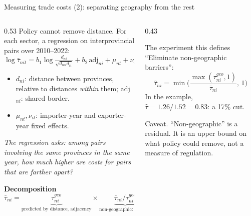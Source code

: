 \documentclass[aspectratio=169,9pt,t]{beamer}
\newcommand{\h}[1]{\hat{#1}}
\newcommand{\plain}[1]{{\color{ipgrey}\small\itshape #1}}
\begin{document}
\begin{frame}{Measuring trade costs (2): separating geography from the rest}
  \begin{columns}[T]
    \begin{column}{0.53\textwidth}
      Policy cannot remove distance. For each sector, a regression on
      interprovincial pairs over 2010--2022:
      {\small\[ \log\bar\tau_{nit}=b_1\log\tfrac{d_{ni}}{\sqrt{d_{nn}d_{ii}}}
         +b_2\,\text{adj}_{ni}+\mu_{nt}+\nu_{it}+\varepsilon_{nit} \]}
      \begin{itemize}
        \item $d_{ni}$: distance between provinces, relative to distances
              \emph{within} them; adj$_{ni}$: shared border.
        \item $\mu_{nt},\nu_{it}$: importer-year and exporter-year fixed
              effects.
      \end{itemize}
      \plain{The regression asks: among pairs involving the same
      provinces in the same year, how much higher are costs for pairs
      that are farther apart?}

      \textbf{Decomposition}
      \[ \bar\tau_{ni}=\underbrace{\tau^{geo}_{ni}}_{\text{predicted by distance, adjacency}}
         \times\underbrace{\bar\tau_{ni}/\tau^{geo}_{ni}}_{\text{non-geographic: the rest}} \]
    \end{column}
    \begin{column}{0.43\textwidth}
      \centering

      \begin{block}{The experiment this defines}
        \small ``Eliminate non-geographic barriers'':
        \[ \h\tau_{ni}=\min\!\Big(\frac{\max(\tau^{geo}_{ni},1)}{\bar\tau_{ni}},\,1\Big) \]
        In the example, $\h\tau=1.26/1.52=0.83$: a 17\% cut.
      \end{block}
      \raggedright\footnotesize
      \alert{Caveat.} ``Non-geographic'' is a residual. It is an upper
      bound on what policy could remove, not a measure of regulation.
    \end{column}
  \end{columns}
\end{frame}
\end{document}
